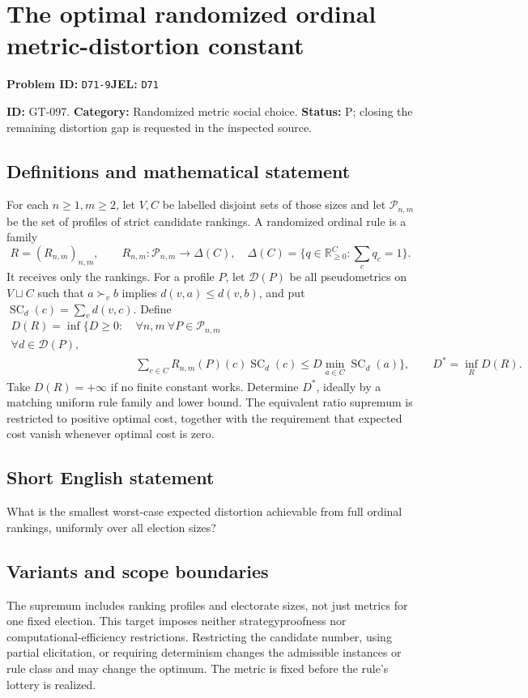 \documentclass[11pt,a4paper]{article}
\begin{document}
\section*{The optimal randomized ordinal metric-distortion constant}
\textbf{Problem ID:} \texttt{D71-9}\quad \textbf{JEL:} \texttt{D71}\par
\label{problem:OP-0227}
\label{game:GT-097}
{\sffamily\small\color{muted}
\noindent\textbf{ID:} GT-097. \textbf{Category:} Randomized metric social choice.
\textbf{Status:} P; closing the remaining distortion gap is requested in the inspected source.
\par}
\subsection*{Definitions and mathematical statement}
For each $n\geq1,m\geq2$, let $V,C$ be labelled disjoint sets of those sizes and let $\mathcal P_{n,m}$ be the set of profiles of strict candidate rankings. A randomized ordinal rule is a family
\[
 R=(R_{n,m})_{n,m},\qquad R_{n,m}:\mathcal P_{n,m}\to\Delta(C),
 \quad\Delta(C)=\{q\in\mathbb R_{\geq0}^{C}:\sum_cq_c=1\}.
\]
It receives only the rankings. For a profile $P$, let $\mathcal D(P)$ be all pseudometrics on $V\sqcup C$ such that $a\succ_v b$ implies $d(v,a)\leq d(v,b)$, and put
$\operatorname{SC}_d(c)=\sum_vd(v,c)$.
Define
\[
 \begin{split}
 D(R)=\inf\{D\geq0:\ &\forall n,m\ \forall P\in\mathcal P_{n,m}\\
                         \forall d\in\mathcal D(P),\\
 &\sum_{c\in C}R_{n,m}(P)(c)\operatorname{SC}_d(c)
      \leq D\min_{a\in C}\operatorname{SC}_d(a)\},
 \qquad D^*=\inf_R D(R).
 \end{split}
\]
Take $D(R)=+\infty$ if no finite constant works. Determine $D^*$, ideally by a matching uniform rule family and lower bound. The equivalent ratio supremum is restricted to positive optimal cost, together with the requirement that expected cost vanish whenever optimal cost is zero.

\subsection*{Short English statement}
What is the smallest worst-case expected distortion achievable from full ordinal rankings, uniformly over all election sizes?

\subsection*{Variants and scope boundaries}
The supremum includes ranking profiles and electorate sizes, not just metrics for one fixed election. This target imposes neither strategyproofness nor computational-efficiency restrictions. Restricting the candidate number, using partial elicitation, or requiring determinism changes the admissible instances or rule class and may change the optimum. The metric is fixed before the rule's lottery is realized.
\end{document}
